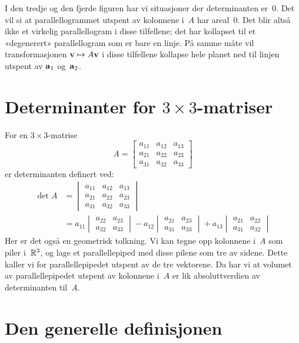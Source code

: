 I den tredje og den fjerde figuren har vi situasjoner der
determinanten er~$0$.  Det vil si at parallellogrammet utspent av
kolonnene i~$A$ har areal~$0$.  Det blir altså ikke et virkelig
parallellogram i disse tilfellene; det har kollapset til et
«degenerert» parallellogram som er bare en linje.  På samme måte vil
transformasjonen $\mathbf{v} \mapsto A \mathbf{v}$ i disse tilfellene kollapse
hele planet ned til linjen utspent av $\mathbf{a}_1$ og~$\mathbf{a}_2$.


\section*{Determinanter for $3 \times 3$-matriser}

For en $3 \times 3$-matrise
\[
A =
\begin{bmatrix}
a_{11} & a_{12} & a_{13} \\
a_{21} & a_{22} & a_{23} \\
a_{31} & a_{32} & a_{33}
\end{bmatrix}
\]
er determinanten definert ved:
\begin{align*}
\det A &=
\begin{vmatrix}
a_{11} & a_{12} & a_{13} \\
a_{21} & a_{22} & a_{23} \\
a_{31} & a_{32} & a_{33}
\end{vmatrix}
\\
&=
a_{11}
\begin{vmatrix}
a_{22} & a_{23} \\
a_{32} & a_{33}
\end{vmatrix}
- a_{12}
\begin{vmatrix}
a_{21} & a_{23} \\
a_{31} & a_{33}
\end{vmatrix}
+ a_{13}
\begin{vmatrix}
a_{21} & a_{22} \\
a_{31} & a_{32}
\end{vmatrix}
\end{align*}
Her er det også en geometrisk tolkning.  Vi kan tegne opp kolonnene
i~$A$ som piler i~$\mathbb{R}^3$, og lage et parallell\-epiped med disse pilene
som tre av sidene.  Dette kaller vi for parallell\-epipedet utspent av
de tre vektorene.  Da har vi at volumet av parallell\-epipedet utspent
av kolonnene i~$A$ er lik absoluttverdien av determinanten til~$A$.


\section*{Den generelle definisjonen}

